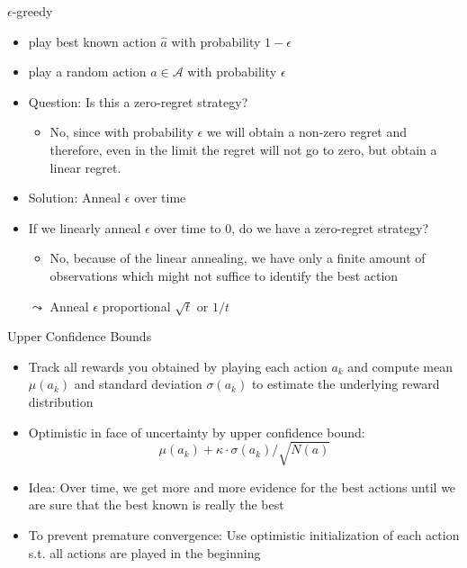 \documentclass[aspectratio=169]{../latex_main/tntbeamer}  %
\begin{document}
\begin{frame}[c]{$\epsilon$-greedy}
	
	\begin{itemize}
		\item play best known action $\hat{a}$ with probability $1-\epsilon$
		\item play a random action $a \in \mathcal{A}$ with probability $\epsilon$ 
		\smallskip
		\item Question: Is this a zero-regret strategy?
		\pause
		\begin{itemize}
			\item No, since with probability $\epsilon$ we will obtain a non-zero regret and therefore, even in the limit the regret will not go to zero, but obtain a linear regret.
		\end{itemize}
		\smallskip\pause
		\item Solution: Anneal $\epsilon$ over time
		\item If we linearly anneal $\epsilon$ over time to $0$, do we have a zero-regret strategy?
		\pause
		\begin{itemize}
			\item No, because of the linear annealing, we have only a finite amount of observations which might not suffice to identify the best action
		\end{itemize}
		\smallskip
		\item[$\leadsto$] Anneal $\epsilon$ proportional $\sqrt{t}$ or $1/t$
	\end{itemize}
	
\end{frame}
\begin{frame}[c]{Upper Confidence Bounds}
	
	\begin{itemize}
		\item Track all rewards you obtained by playing each action $a_k$ and compute mean $\mu(a_k)$ and standard deviation $\sigma(a_k)$ to estimate the underlying reward distribution
		\item Optimistic in face of uncertainty by upper confidence bound:
		$$\mu(a_k) + \kappa \cdot \sigma(a_k) / \sqrt{N(a)}$$
		\item Idea: Over time, we get more and more evidence for the best actions until we are sure that the best known is really the best
		\medskip
		\pause
		\item To prevent premature convergence: Use optimistic initialization of each action s.t. all actions are played in the beginning
	\end{itemize}
	
\end{frame}
\end{document}
